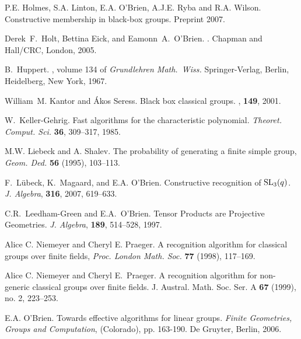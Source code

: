 \documentclass[12pt]{article}
\def\SL{{\rm SL}}
\begin{document}
\begin{thebibliography}{10}
 P.E. Holmes, S.A. Linton, E.A. O'Brien, A.J.E. Ryba and
R.A. Wilson. Constructive membership in black-box groups. Preprint 2007.

Derek~F.\ Holt, Bettina Eick, and Eamonn~A.\ O'Brien.
.
\newblock Chapman and Hall/CRC, London, 2005.

B.\ Huppert.
, 
volume 134 of {\em Grundlehren Math.\ Wiss.}
\newblock Springer-Verlag, Berlin, Heidelberg, New York, 1967.

William~M. Kantor and {\'A}kos Seress.
\newblock Black box classical groups.
, {\bf 149}, 2001.

W.\ Keller-Gehrig. Fast algorithms for the characteristic
polynomial. {\it Theoret. Comput. Sci.} {\bf 36}, 309--317, 1985. 
    
 M.W. Liebeck and A. Shalev. The probability of generating
a finite simple group, {\it Geom. Ded.} {\bf 56} (1995), 103--113.

F.\ L{\"u}beck, K.\ Magaard, and E.A. O'Brien. 
Constructive recognition of $\SL_3(q)$.
{\it J. Algebra}, {\bf 316}, 2007, 619--633.

C.R.\ Leedham-Green and E.A.\ O'Brien. 
Tensor Products are Projective Geometries.
{\it J. Algebra}, {\bf 189}, 514--528, 1997.


 Alice C. Niemeyer and Cheryl E. Praeger.
A recognition algorithm for classical groups over finite fields,
{\it Proc. London Math. Soc.} {\bf 77} (1998), 117--169.

Alice C. Niemeyer and Cheryl E.\ Praeger.
A recognition algorithm for non-generic classical groups over finite fields. 
J. Austral. Math. Soc. Ser. A {\bf 67} (1999), no. 2, 223--253.


E.A. O'Brien. Towards effective algorithms for linear groups.
{\it Finite Geometries, Groups and Computation},
(Colorado), pp. 163-190. De Gruyter, Berlin, 2006.


\end{thebibliography}
\end{document}
